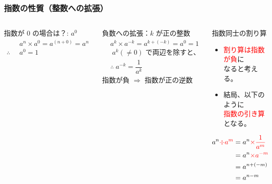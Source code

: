 \documentclass[12pt, dvipdfmx]{beamer}
\begin{document}
\begin{frame}
	\frametitle{指数の性質（整数への拡張）}
	\begin{columns}[T, onlytextwidth]
			\begin{block}{指数が 0 の場合は？: $a^0$}
				\vspace{-5mm}
				\begin{align*}
				&a^n \times a^0 =a^{(n+0)} = a^n \\
				\therefore \;\;&a^0 = 1
				\end{align*}
			\end{block}
			\begin{exampleblock}{負数への拡張：$k$ が正の整数}
				\vspace{-5mm}
				\begin{align*}
					&a^k \times a^{-k} = a^{k+(-k)}=a^0=1 \\
					&\; \text{$a^k (\ne 0)$ で両辺を除すと、} \\
					&\therefore \; a^{-k} = \dfrac{1}{a^k}
				\end{align*}
				\alert{指数が負 $\Rightarrow$ 指数が正の逆数}
			\end{exampleblock}
		\begin{alertblock}{指数同士の割り算}
			\begin{itemize}
				\item \textcolor{red}{割り算は指数が負}に\\なると考える。
				\item 結局、以下のように\\\textcolor{red}{指数の引き算}となる。
			\end{itemize}
			\vspace{-3mm}
			\begin{align*}
				a^n \textcolor{red}{\div a^m} 
					&=a^n \textcolor{red}{\times \dfrac{1}{a^m}} \\
					&= a^n \textcolor{red}{\times a^{-m}} \\
					&= a^{n + (-m)}\\
					&= a^{n-m}
			\end{align*}
		\end{alertblock}
	\end{columns}	
\end{frame}
\end{document}
